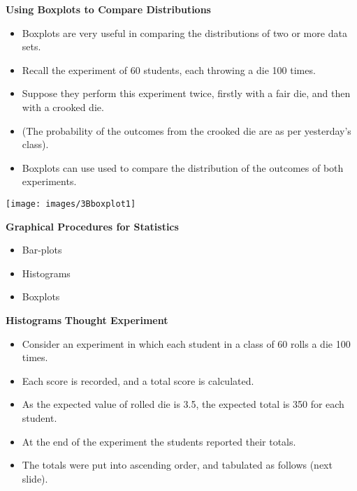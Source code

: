 \documentclass[]{report}
\begin{document}
{
\textbf{Using Boxplots to Compare Distributions}
\begin{itemize}
\item  Boxplots are very useful in comparing the distributions of two or more data sets.
\item  Recall the experiment of 60 students, each throwing a die 100 times.
\item  Suppose they perform this experiment twice, firstly with a fair die, and then with a crooked die.
\item  (The probability of the outcomes from the crooked die are as per yesterday's class).
\item  Boxplots can use used to compare the distribution of the outcomes of both experiments.
\end{itemize}


\begin{center}
\texttt{[image: images/3Bboxplot1]}
\end{center}
}

\newpage

{

\textbf{Graphical Procedures for Statistics}
\begin{itemize}
\item Bar-plots
\item Histograms
\item Boxplots

\end{itemize}
}
{
\textbf{Histograms}
\noindent \textbf{Thought Experiment}
\begin{itemize}
\item Consider an experiment in which each student in a class of 60 rolls a die 100 times.
\item Each score is recorded, and a total score is calculated.
\item As the expected value of rolled die is 3.5, the expected total is 350 for each student.
\item At the end of the experiment the students reported their totals.
\item The totals were put into ascending order, and tabulated as follows (next slide).
\end{itemize}

}
\end{document}
